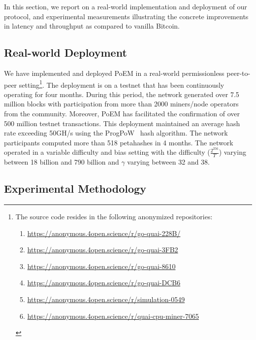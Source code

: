 In this section, we report on a real-world implementation and deployment of our
protocol, and experimental measurements illustrating the concrete improvements
in latency and throughput as compared to vanilla Bitcoin.

\subsection{Real-world Deployment}\label{sec:deployment}

We have implemented and deployed PoEM in a real-world permissionless peer-to-peer
setting\footnote{
    The source code resides in the following anonymized repositories:
    \begin{enumerate}
        \item \url{https://anonymous.4open.science/r/go-quai-228B/}
        \item \url{https://anonymous.4open.science/r/go-quai-3FB2}
        \item \url{https://anonymous.4open.science/r/go-quai-8610}
        \item \url{https://anonymous.4open.science/r/go-quai-DCB6}
        \item \url{https://anonymous.4open.science/r/simulation-0549}
        \item \url{https://anonymous.4open.science/r/quai-cpu-miner-7065}
    \end{enumerate}
}.
The deployment is on a testnet that has been continuously operating for
four months. During this period, the network generated over 7.5 million blocks
with participation from
more than 2000 miners/node operators from the community. Moreover, PoEM has facilitated the
confirmation of over 500 million testnet transactions. This deployment maintained an
average hash rate exceeding 50GH/s using the ProgPoW~\cite{progpow} hash algorithm.
The network participants computed more than 518 petahashes in 4 months.
The network operated in a variable difficulty and bias setting with the difficulty ($\frac{2^{256}}{T}$)
varying between 18 billion and 790 billion and $\gamma$ varying between 32 and 38.

\subsection{Experimental Methodology}

